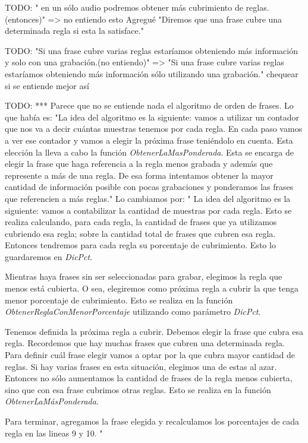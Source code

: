 TODO: " en un sólo audio podremos obtener más cubrimiento de reglas.(entonces)" => no entiendo esto
Agregué "Diremos que una frase cubre una determinada regla si esta la satisface."

TODO: "Si una frase cubre varias reglas estaríamos obteniendo más información y solo con una grabación.(no entiendo)" => "Si una frase cubre varias reglas estaríamos obteniendo más información sólo utilizando una grabación." chequear si se entiende mejor así

TODO: *** Parece que no se entiende nada el algoritmo de orden de frases. Lo que había es:
"La idea del algoritmo es la siguiente: vamos a utilizar un contador que nos va a decir cuántas muestras tenemos por cada regla. En cada paso vamos a ver ese contador y vamos a elegir la próxima frase teniéndolo en cuenta. Esta elección la lleva a cabo la función \textit{ObtenerLaMasPonderada}. Esta se encarga de elegir la frase que haga referencia a la regla menos grabada y además que represente a más de una regla. De esa forma intentamos obtener la mayor cantidad de información posible con pocas grabaciones y ponderamos las frases que referencien a más reglas."
Lo cambiamos por:
"
La idea del algoritmo es la siguiente: vamos a contabilizar la cantidad de muestras por cada regla. Esto se realiza calculando, para cada regla, la cantidad de frases que ya utilizamos cubriendo esa regla; sobre la cantidad total de frases que cubren esa regla. Entonces tendremos para cada regla su porcentaje de cubrimiento. Esto lo guardaremos en \textit{DicPct}.

Mientras haya frases sin ser seleccionadas para grabar, elegimos la regla que menos está cubierta. O sea, elegiremos como próxima regla a cubrir la que tenga menor porcentaje de cubrimiento. Esto se realiza en la función \textit{ObtenerReglaConMenorPorcentaje} utilizando como parámetro \textit{DicPct}.

Tenemos definida la próxima regla a cubrir. Debemos elegir la frase que cubra esa regla. Recordemos que hay muchas frases que cubren una determinada regla. Para definir cuál frase elegir vamos a optar por la que cubra mayor cantidad de reglas. Si hay varias frases en esta situación, elegimos una de estas al azar. Entonces no sólo aumentamos la cantidad de frases de la regla menos cubierta, sino que con esa frase cubrimos otras reglas. Esto se realiza en la función \textit{ObtenerLaMásPonderada}.

Para terminar, agregamos la frase elegida y recalculamos los porcentajes de cada regla en las lineas 9 y 10.
"

